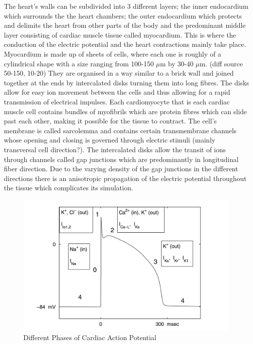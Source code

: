 \documentclass[../draft_1.tex]{subfiles}
\begin{document}
The heart's walls can be subdivided into 3 different layers; the inner endocardium which surrounds the the heart chambers; the outer endocardium which protects and delimits the heart from other parts of the body and the predominant middle layer consisting of cardiac muscle tissue called myocardium. This is where the conduction of the electric potential and the heart contractions mainly take place. Myocardium is made up of sheets of cells, where each one is roughly of a cylindrical shape with a size ranging from 100-150 $\mu$m by 30-40 $\mu$m. (diff source 50-150, 10-20) They are organised in a way similar to a brick wall and joined together at the ends by intercalated disks turning them into long fibres. The disks allow for easy ion movement between the cells and thus allowing for a rapid transmission of electrical impulses. Each cardiomyocyte that is each cardiac muscle cell contains bundles of myofibrils which are protein fibres which can slide past each other, making it possible for the tissue to contract. The cell's membrane is called sarcolemma and contains certain transmembrane channels whose opening and closing is governed through electric stimuli (mainly transversal cell direction?). The intercalated disks allow the transit of ions through channels called gap junctions which are predominantly in longitudinal fiber direction. Due to the varying density of the gap junctions in the different directions there is an anisotropic propagation of the electric potential throughout the tissue which complicates its simulation. 

\begin{figure}[ht!]
	\centering
	\includegraphics[scale=0.3]{images/electrophysiology/cardiac_action_pot_franzone}
	\caption{Different Phases of Cardiac Action Potential \cite{franzone2014mathematical}}
\end{figure}
\end{document}
